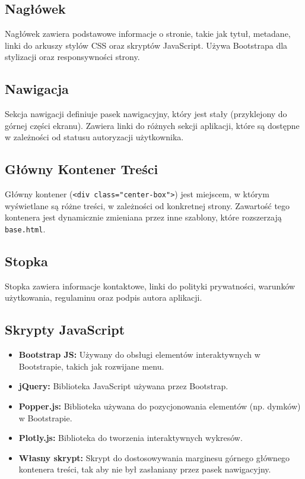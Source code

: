 \documentclass[12pt,a4paper]{report}
\begin{document}
\subsection{Nagłówek}
Nagłówek zawiera podstawowe informacje o stronie, takie jak tytuł, metadane, linki do arkuszy stylów CSS oraz skryptów JavaScript. Używa Bootstrapa dla stylizacji oraz responsywności strony.

\subsection{Nawigacja}
Sekcja nawigacji definiuje pasek nawigacyjny, który jest stały (przyklejony do górnej części ekranu). Zawiera linki do różnych sekcji aplikacji, które są dostępne w zależności od statusu autoryzacji użytkownika.

\subsection{Główny Kontener Treści}
Główny kontener (\texttt{<div class="center-box">}) jest miejscem, w którym wyświetlane są różne treści, w zależności od konkretnej strony. Zawartość tego kontenera jest dynamicznie zmieniana przez inne szablony, które rozszerzają \texttt{base.html}.

\subsection{Stopka}
Stopka zawiera informacje kontaktowe, linki do polityki prywatności, warunków użytkowania, regulaminu oraz podpis autora aplikacji.

\subsection{Skrypty JavaScript}
\begin{itemize}
    \item \textbf{Bootstrap JS:} Używany do obsługi elementów interaktywnych w Bootstrapie, takich jak rozwijane menu.
    \item \textbf{jQuery:} Biblioteka JavaScript używana przez Bootstrap.
    \item \textbf{Popper.js:} Biblioteka używana do pozycjonowania elementów (np. dymków) w Bootstrapie.
    \item \textbf{Plotly.js:} Biblioteka do tworzenia interaktywnych wykresów.
    \item \textbf{Własny skrypt:} Skrypt do dostosowywania marginesu górnego głównego kontenera treści, tak aby nie był zasłaniany przez pasek nawigacyjny.
\end{itemize}
\end{document}
